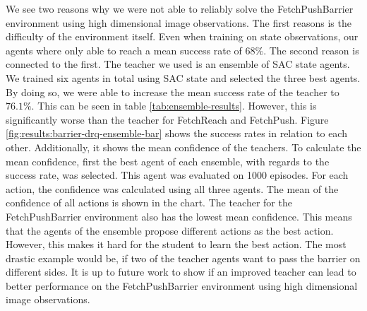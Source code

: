We see two reasons why we were not able to reliably solve the FetchPushBarrier environment using high dimensional image observations. The first reasons is the difficulty of the environment itself. Even when training on state observations, our agents where only able to reach a mean success rate of $68\%$. The second reason is connected to the first. The teacher we used is an ensemble of SAC state agents. We trained six agents in total using SAC state and selected the three best agents. By doing so, we were able to increase the mean success rate of the teacher to $76.1\%$. This can be seen in table \ref{tab:ensemble-results}. However, this is significantly worse than the teacher for FetchReach and FetchPush. Figure \ref{fig:results:barrier-drq-ensemble-bar} shows the success rates in relation to each other. Additionally, it shows the mean confidence of the teachers. To calculate the mean confidence, first the best agent of each ensemble, with regards to the success rate, was selected. This agent was evaluated on 1000 episodes. For each action, the confidence was calculated using all three agents. The mean of the confidence of all actions is shown in the chart. The teacher for the FetchPushBarrier environment also has the lowest mean confidence. This means that the agents of the ensemble propose different actions as the best action. However, this makes it hard for the student to learn the best action. The most drastic example would be, if two of the teacher agents want to pass the barrier on different sides. It is up to future work to show if an improved teacher can lead to better performance on the FetchPushBarrier environment using high dimensional image observations.

